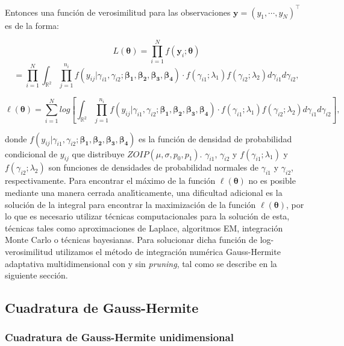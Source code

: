 Entonces una funci\'{o}n de verosimilitud para las observaciones $\mathbf{y}=(y_1, \cdots, y_N)^{\top}$ es de la forma:

\[
L(\boldsymbol{\theta})=\prod_{i=1}^{N}f(\mathbf{y}_i;\boldsymbol{\theta})
\]
\[
=\prod_{i=1}^{N}\int_{\mathbb{R}^2}\prod_{j=1}^{n_i}f(y_{ij}|\gamma_{i1},\gamma_{i2};\boldsymbol{\beta_1}, \boldsymbol{\beta_2}, \boldsymbol{\beta_3}, \boldsymbol{\beta_4})\cdot f(\gamma_{i1};\lambda_1) f(\gamma_{i2};\lambda_2) d\gamma_{i1}d\gamma_{i2},
\]

\begin{equation}
\ell(\boldsymbol{\theta})=\sum_{i=1}^{N}log \left[\int_{\mathbb{R}^2}\prod_{j=1}^{n_i}f(y_{ij}|\gamma_{i1},\gamma_{i2};\boldsymbol{\beta_1}, \boldsymbol{\beta_2}, \boldsymbol{\beta_3}, \boldsymbol{\beta_4})\cdot f(\gamma_{i1};\lambda_1) f(\gamma_{i2};\lambda_2) d\gamma_{i1}d\gamma_{i2}\right],
 \label{func_ver_mix}
\end{equation}


donde $f(y_{ij}|\gamma_{i1},\gamma_{i2};\boldsymbol{\beta_1}, \boldsymbol{\beta_2}, \boldsymbol{\beta_3}, \boldsymbol{\beta_4})$ es la funci\'{o}n de densidad de probabilidad condicional de $y_{ij}$ que distribuye $ZOIP(\mu,\sigma,p_0,p_1)$. $\gamma_{i1}$, $\gamma_{i2}$ y $f(\gamma_{i1};\lambda_1)$ y $f(\gamma_{i2};\lambda_2)$ son funciones de densidades de probabilidad normales de $\gamma_{i1}$ y $\gamma_{i2}$, respectivamente. Para encontrar el m\'{a}ximo de la funci\'{o}n $\ell(\boldsymbol{\theta})$ no es posible mediante una manera cerrada anal\'{\i}ticamente, una dificultad adicional es la soluci\'{o}n de la integral para encontrar la maximizaci\'{o}n de la funci\'{o}n $\ell(\boldsymbol{\theta})$, por lo que es necesario utilizar t\'{e}cnicas computacionales para la soluci\'{o}n de esta, t\'{e}cnicas tales como aproximaciones de Laplace, algoritmos EM, integraci\'{o}n Monte Carlo o t\'{e}cnicas bayesianas. Para solucionar dicha funci\'{o}n de log-verosimilitud utilizamos el m\'{e}todo de integraci\'{o}n num\'{e}rica Gauss-Hermite adaptativa multidimensional con y sin \textit{pruning}, tal como se describe en la siguiente secci\'{o}n.


\subsection{Cuadratura de Gauss-Hermite}\label{sec:Cuadratura}

\subsubsection{Cuadratura de Gauss-Hermite unidimensional}

